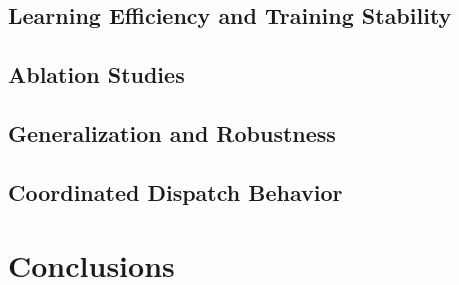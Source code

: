 \documentclass[preprint,12pt]{elsarticle}
\begin{document}
\subsection{Learning Efficiency and Training Stability}

\subsection{Ablation Studies}

\subsection{Generalization and Robustness}

\subsection{Coordinated Dispatch Behavior}

\section{Conclusions}
\label{sec:conclusions}

\appendix




\end{document}
